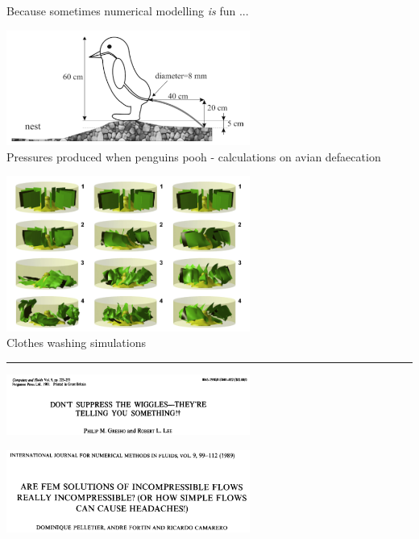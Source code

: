 Because sometimes numerical modelling {\sl is} fun ...

\begin{center}
\begin{minipage}{0.45\textwidth}
\centering
\includegraphics[width=8cm]{images/interesting/mega03}\\
{\tiny Pressures produced when penguins pooh - calculations on avian defaecation \cite{mega03}}
\end{minipage}\hfill
\begin{minipage}{0.45\textwidth}
\centering
\includegraphics[width=8cm]{images/interesting/akds14}\\
{\tiny Clothes washing simulations \cite{akds14}}
\end{minipage}
\end{center}

\par\noindent\rule{\textwidth}{0.4pt}

\begin{center}
\begin{minipage}{0.45\textwidth}
\centering
\includegraphics[width=8cm]{images/interesting/grle81}\\
{\tiny \cite{grle81}}
\end{minipage}\hfill
\begin{minipage}{0.45\textwidth}
\centering
\includegraphics[width=8cm]{images/interesting/pefc89}\\
{\tiny \cite{pefc89}}
\end{minipage}
\end{center}

